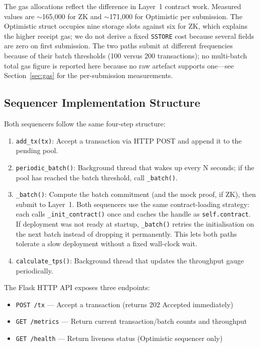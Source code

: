The gas allocations reflect the difference in Layer~1 contract work. Measured values are $\sim$165,000 for ZK and $\sim$171,000 for Optimistic per submission. The Optimistic struct occupies nine storage slots against six for ZK, which explains the higher receipt gas; we do not derive a fixed \texttt{SSTORE} cost because several fields are zero on first submission. The two paths submit at different frequencies because of their batch thresholds (100 versus 200 transactions); no multi-batch total gas figure is reported here because no raw artefact supports one---see Section~\ref{sec:gas} for the per-submission measurements.

\subsection{Sequencer Implementation Structure}

Both sequencers follow the same four-step structure:

\begin{enumerate}
    \item \texttt{add\_tx(tx)}: Accept a transaction via HTTP POST and append it to the pending pool.
    \item \texttt{periodic\_batch()}: Background thread that wakes up every N seconds; if the pool has reached the batch threshold, call \texttt{\_batch()}.
    \item \texttt{\_batch()}: Compute the batch commitment (and the mock proof, if ZK), then submit to Layer~1. Both sequencers use the same contract-loading strategy: each calls \texttt{\_init\_contract()} once and caches the handle as \texttt{self.contract}. If deployment was not ready at startup, \texttt{\_batch()} retries the initialisation on the next batch instead of dropping it permanently. This lets both paths tolerate a slow deployment without a fixed wall-clock wait.
    \item \texttt{calculate\_tps()}: Background thread that updates the throughput gauge periodically.
\end{enumerate}

The Flask HTTP API exposes three endpoints:
\begin{itemize}
    \item \texttt{POST /tx} — Accept a transaction (returns 202 Accepted immediately)
    \item \texttt{GET /metrics} — Return current transaction/batch counts and throughput
    \item \texttt{GET /health} — Return liveness status (Optimistic sequencer only)
\end{itemize}

